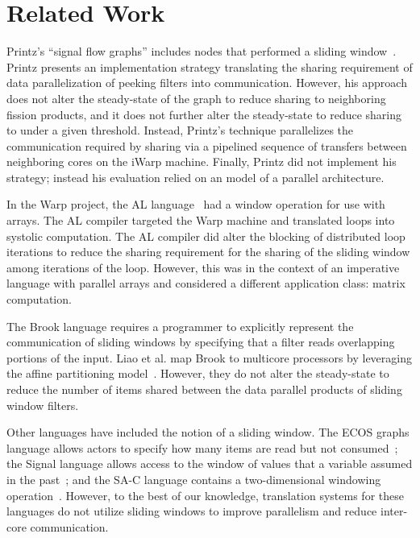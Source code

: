 \section{Related Work}
Printz's ``signal flow graphs'' includes nodes that performed a
sliding window~\cite{printz91thesis}.  Printz presents an
implementation strategy translating the sharing requirement of data
parallelization of peeking filters into communication.  However, his
approach does not alter the steady-state of the graph to reduce
sharing to neighboring fission products, and it does not further alter
the steady-state to reduce sharing to under a given threshold.
Instead, Printz's technique parallelizes the communication required by
sharing via a pipelined sequence of transfers between neighboring
cores on the iWarp machine.  Finally, Printz did not implement his
strategy; instead his evaluation relied on an model of a parallel
architecture.

In the Warp project, the AL language~\cite{tseng89thesis,tseng90} had
a window operation for use with arrays.  The AL compiler targeted the
Warp machine and translated loops into systolic computation.  The AL
compiler did alter the blocking of distributed loop iterations to
reduce the sharing requirement for the sharing of the sliding window
among iterations of the loop.  However, this was in the context of an
imperative language with parallel arrays and considered a different
application class: matrix computation. 

The Brook language requires a programmer to explicitly represent the
communication of sliding windows by specifying that a filter reads
overlapping portions of the input. Liao et al. map Brook to multicore
processors by leveraging the affine partitioning
model~\cite{liao06brook}. However, they do not alter the steady-state
to reduce the number of items shared between the data parallel
products of sliding window filters.

Other languages have included the notion of a sliding window.  The ECOS
graphs language allows actors to specify how many items are read but
not consumed~\cite{huang_ecos_1992}; the Signal language allows access
to the window of values that a variable assumed in the
past~\cite{le_guernic_signal--data_1986}; and the SA-C language
contains a two-dimensional windowing
operation~\cite{draper_compiling_2001}.  However, to the best of our
knowledge, translation systems for these languages do not utilize
sliding windows to improve parallelism and reduce inter-core
communication.
